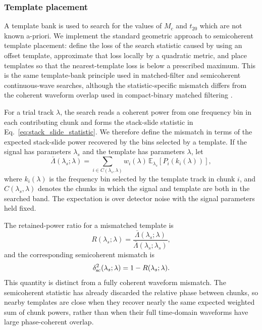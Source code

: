 \documentclass[aps,prd,amsmath,floats,floatfix, twocolumn,
superscriptaddress,nofootinbib,showpacs]{revtex4-2}
\begin{document}
\subsubsection{Template placement}
\label{sec:power_stack_mismatch}
A template bank is used to search for the values of $M_c$ and $t_{20}$ which are not
known a-priori.  We implement the standard geometric approach to semicoherent template
placement: define the loss of the search statistic caused by using an offset
template, approximate that loss locally by a quadratic metric, and place
templates so that the nearest-template loss is below a prescribed maximum.  This
is the same template-bank principle used in matched-filter and semicoherent
continuous-wave searches, although the statistic-specific mismatch differs from
the coherent waveform overlap used in compact-binary matched filtering
\cite{DUMMY_Prix2007,DUMMY_Wette2014,DUMMY_Weave2018}.

For a trial track $\lambda$, the search reads a coherent power from one
frequency bin in each contributing chunk and forms the stack-slide statistic in
Eq.~\eqref{eq:stack_slide_statistic}.  We therefore define the mismatch in
terms of the expected stack-slide power recovered by the bins selected by a
template.  If the signal has parameters $\lambda_s$ and the template has
parameters $\lambda$, let
\begin{equation}
\bar\Lambda(\lambda_s;\lambda)
=
\sum_{i\in C(\lambda_s,\lambda)}
w_i(\lambda)\,
\mathbb{E}_{\lambda_s}
\left[
P_i\!\left(k_i(\lambda)\right)
\right],
\label{eq:expected_stack_slide_power}
\end{equation}
where $k_i(\lambda)$ is the frequency bin selected by the template track in
chunk $i$, and $C(\lambda_s,\lambda)$ denotes the chunks in which the signal and
template are both in the searched band.  The expectation is over detector noise
with the signal parameters held fixed.

The retained-power ratio for a mismatched template is
\begin{equation}
R(\lambda_s;\lambda)
=
\frac{
\bar\Lambda(\lambda_s;\lambda)
}{
\bar\Lambda(\lambda_s;\lambda_s)
},
\label{eq:stack_slide_retained_power}
\end{equation}
and the corresponding semicoherent mismatch is
\begin{equation}
\delta^2_{\rm sc}(\lambda_s;\lambda)
=
1-R(\lambda_s;\lambda).
\label{eq:semicoherent_mismatch}
\end{equation}
This quantity is distinct from a fully coherent waveform mismatch.  The
semicoherent statistic has already discarded the relative phase between chunks,
so nearby templates are close when they recover nearly the same expected
weighted sum of chunk powers, rather than when their full time-domain waveforms
have large phase-coherent overlap.
\end{document}
